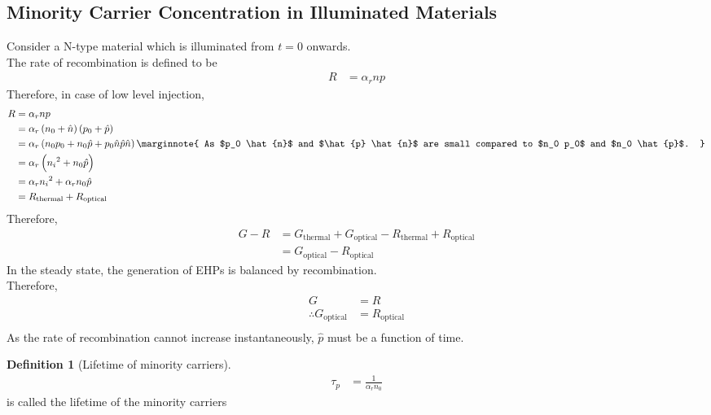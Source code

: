 \documentclass[titlepage, fleqn, a4paper, 12pt, twoside]{article}
\theoremstyle{definition}
\newtheorem{definition}{Definition}
\theoremstyle{theorem}
\let\Oldsubsection\subsection
\renewcommand{\subsection}{\FloatBarrier\Oldsubsection}
\begin{document}
\subsection{Minority Carrier Concentration in Illuminated Materials}

Consider a N-type material which is illuminated from $t = 0$ onwards.\\
The rate of recombination is defined to be
\begin{align*}
	R &= \alpha_r n p
\end{align*}
Therefore, in case of low level injection,
\begin{align*}
	R &= \alpha_r n p\\
	&= \alpha_r \left( n_0 + \hat{n} \right) \left( p_0 + \hat{p} \right)\\
	&= \alpha_r \left( n_0 p_0 + n_0 \hat{p} + p_0 \hat{n} \hat{p} \hat{n} \right)
	\marginnote
	{
		As $p_0 \hat{n}$ and $\hat{p} \hat{n}$ are small compared to $n_0 p_0$ and $n_0 \hat{p}$.
	}\\
	&= \alpha_r \left( {n_i}^2 + n_0 \hat{p} \right)\\
	&= \alpha_r {n_i}^2 + \alpha_r n_0 \hat{p}\\
	&= R_{\text{thermal}} + R_{\text{optical}}
\end{align*}
Therefore,
\begin{align*}
	G - R &= G_{\text{thermal}} + G_{\text{optical}} - R_{\text{thermal}} + R_{\text{optical}}\\
	&= G_{\text{optical}} - R_{\text{optical}}
\end{align*}
In the steady state, the generation of EHPs is balanced by recombination.\\
Therefore,
\begin{align*}
	G &= R\\
	\therefore G_{\text{optical}} &= R_{\text{optical}}\\
\end{align*}
As the rate of recombination cannot increase instantaneously, $\hat{p}$ must be a function of time.

\begin{definition}[Lifetime of minority carriers]
	\begin{align*}
		\tau_p &= \frac{1}{\alpha_r n_0}
	\end{align*}
	is called the lifetime of the minority carriers
\end{definition}
\end{document}
